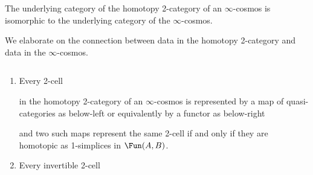 \begin{lemma}\label{lem:underlying-cat-iso}
  The underlying category of the homotopy 2-category of an $\infty$-cosmos is isomorphic to the underlying category of the $\infty$-cosmos.
\end{lemma}

We elaborate on the connection between data in the homotopy 2-category and data in the $\infty$-cosmos.

\begin{lemma}\label{lem:invertible-2-cell}$\quad$
  \begin{enumerate}
  \item\label{itm:2-cell-as-functor} Every 2-cell
  \begin{center}
  \end{center}  in the homotopy 2-category of an $\infty$-cosmos is represented by a map of quasi-categories as below-left or equivalently by a functor as below-right
  \begin{center}
  \end{center}
  and two such maps represent the same 2-cell if and only if they are homotopic as 1-simplices in $\Fun(A,B)$.
  \item\label{itm:2-iso-as-functor} Every invertible 2-cell
  \begin{center}
  \end{center}

\end{enumerate}
\end{lemma}
